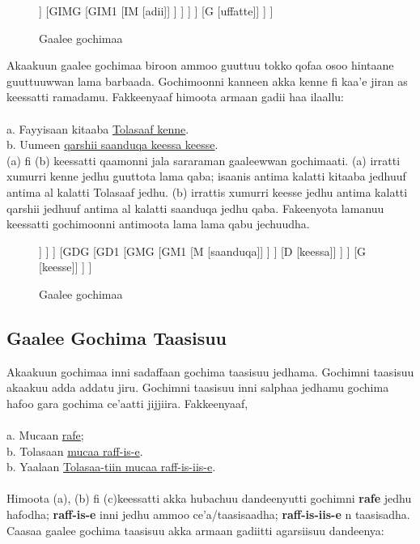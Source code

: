 \documentclass[11pt,b5paper]{book}
\begin{document}
\begin{figure}[H]										
	\caption{Gaalee gochimaa}
	\centering
	\begin{forest}
		[GGG
			[GG1
				[GMG
					[GM1
						[M [uccuu]]
						[GIMG
							[GIM1
								[IM [adii]]
							]
						]
					]
				]
				[G [uffatte]]
			]
		]
	\end{forest}
\end{figure}

Akaakuun gaalee gochimaa biroon ammoo guuttuu tokko qofaa osoo hintaane guuttuuwwan lama barbaada. Gochimoonni
kanneen akka kenne fi kaa’e jiran as keessatti ramadamu. Fakkeenyaaf himoota armaan gadii haa ilaallu: \\
\\
a. Fayyisaan kitaaba \underline{Tolasaaf kenne}.\\
b. Uumeen \underline{qarshii saanduqa keessa keesse}. \\

(a) fi (b) keessatti qaamonni jala sararaman gaaleewwan gochimaati. (a) irratti xumurri kenne jedhu guuttota lama
qaba; isaanis antima kalatti kitaaba jedhuuf antima al kalatti Tolasaaf jedhu. (b) irrattis xumurri keesse jedhu antima kalatti qarshii jedhuuf antima al kalatti saanduqa jedhu qaba. Fakeenyota lamanuu keessatti gochimoonni antimoota lama lama qabu jechuudha. 

\begin{figure}[H]										
	\caption{Gaalee gochimaa}
	\centering
	\begin{forest}
		[GGG
			[GG1
			[GMG
				[GM1
					[M [qarshii]]
				]
			]
			[GDG
				[GD1
					[GMG
						[GM1
							[M [saanduqa]]
						]
					]
					[D [keessa]]
				]
			]
			[G [keesse]]
			]
		]
	\end{forest}
\end{figure}


\subsection{Gaalee Gochima Taasisuu}
Akaakuun gochimaa inni sadaffaan gochima taasisuu jedhama. Gochimni taasisuu akaakuu adda addatu jiru. Gochimni
taasisuu inni salphaa jedhamu gochima hafoo gara gochima ce'aatti jijjiira. Fakkeenyaaf, \\
\\
a. Mucaan \underline{rafe}; \\
b. Tolasaan \underline{mucaa raff-is-e}.\\
b. Yaalaan \underline{Tolasaa-tiin mucaa raff-is-iis-e}. \\
\\
Himoota (a), (b) fi (c)keessatti akka hubachuu dandeenyutti gochimni \textbf{rafe} jedhu hafodha; \textbf{raff-is-e} inni jedhu ammoo ce'a/taasisaadha; \textbf{raff-is-iis-e }n taasisadha. Caasaa gaalee gochima taasisuu akka armaan gadiitti agarsiisuu dandeenya:
\end{document}
